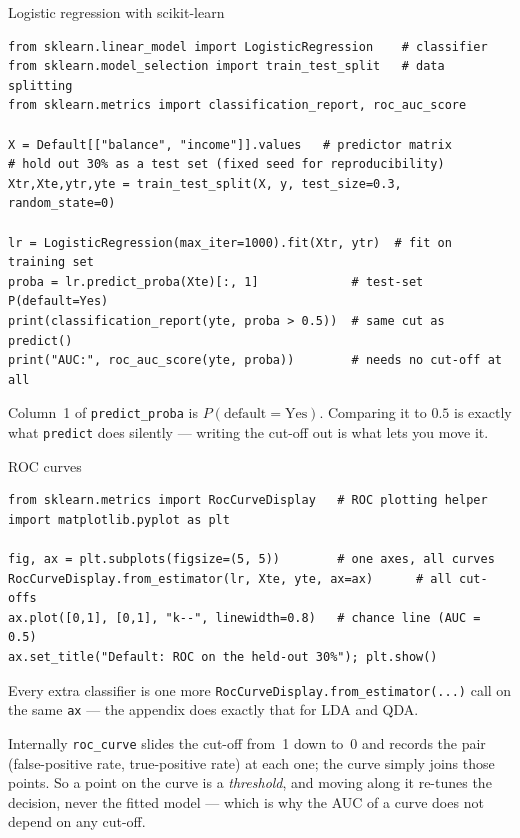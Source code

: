 \documentclass[aspectratio=169,11pt]{beamer}
\begin{document}
\begin{frame}[fragile]{Logistic regression with scikit-learn}
  \begin{lstlisting}
from sklearn.linear_model import LogisticRegression    # classifier
from sklearn.model_selection import train_test_split   # data splitting
from sklearn.metrics import classification_report, roc_auc_score

X = Default[["balance", "income"]].values   # predictor matrix
# hold out 30% as a test set (fixed seed for reproducibility)
Xtr,Xte,ytr,yte = train_test_split(X, y, test_size=0.3, random_state=0)

lr = LogisticRegression(max_iter=1000).fit(Xtr, ytr)  # fit on training set
proba = lr.predict_proba(Xte)[:, 1]             # test-set P(default=Yes)
print(classification_report(yte, proba > 0.5))  # same cut as predict()
print("AUC:", roc_auc_score(yte, proba))        # needs no cut-off at all
  \end{lstlisting}
  \vspace{-1mm}
  \begin{readme}
    Column~1 of \texttt{predict\_proba} is $P(\text{default}=\text{Yes})$.
    Comparing it to $0.5$ is exactly what \texttt{predict} does silently
    --- writing the cut-off out is what lets you move it.
  \end{readme}
\end{frame}


\begin{frame}[fragile]{ROC curves}
  \begin{lstlisting}
from sklearn.metrics import RocCurveDisplay   # ROC plotting helper
import matplotlib.pyplot as plt

fig, ax = plt.subplots(figsize=(5, 5))        # one axes, all curves
RocCurveDisplay.from_estimator(lr, Xte, yte, ax=ax)      # all cut-offs
ax.plot([0,1], [0,1], "k--", linewidth=0.8)   # chance line (AUC = 0.5)
ax.set_title("Default: ROC on the held-out 30%"); plt.show()
  \end{lstlisting}
  Every extra classifier is one more
  \texttt{RocCurveDisplay.from\_estimator(...)} call on the same
  \texttt{ax} --- the appendix does exactly that for LDA and QDA.
  \begin{readme}
    Internally \texttt{roc\_curve} slides the cut-off from~1 down to~0 and
    records the pair (false-positive rate, true-positive rate) at each one;
    the curve simply joins those points. So a point on the curve is a
    \emph{threshold}, and moving along it re-tunes the decision, never the
    fitted model --- which is why the AUC of a curve does not depend on any
    cut-off.
  \end{readme}
\end{frame}
\end{document}
